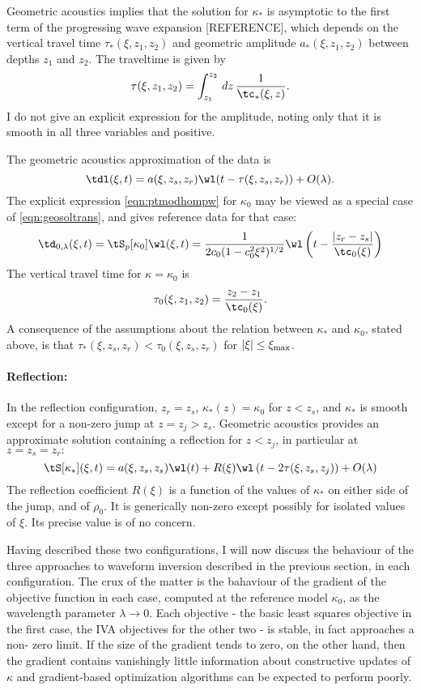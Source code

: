 Geometric acoustics implies that the solution for $\kappa_*$ is
asymptotic to the first term of the progressing wave expansion
[REFERENCE], which depends on the vertical
travel time $\tau_*(\xi,z_1,z_2)$ and geometric amplitude
$a_*(\xi,z_1,z_2)$ between depths $z_1$ and $z_2$. The traveltime is given by
\[
\tau(\xi,z_1,z_2) = \int_{z_1}^{z_2}\,dz\, \frac{1}{\tc_*(\xi,z)}.
\]
I do not give an explicit expression for the amplitude, noting only
that it is smooth in all three variables and positive.

The geometric
acoustics approximation of the data is
\begin{equation}
  \label{eqn:geosoltrans}
  \tdl(\xi,t) = a(\xi,z_s,z_r)\wl(t-\tau(\xi,z_s,z_r)) + O(\lambda). 
\end{equation}
The explicit expression \ref{eqn:ptmodhompw} for $\kappa_0$ may be 
viewed as a special case of \ref{eqn:geosoltrans}, and gives reference 
data for that case: 
\begin{equation}
  \label{eqn:analsoltrans}
  \td_{0,\lambda}(\xi,t) =  \tS_p[\kappa_0]\wl(\xi,t)  = \frac{1}{2c_0(1-c_0^2\xi^2)^{1/2}}\wl 
                                \left(t-\frac{|z_r-z_s|}{\tc_0(\xi)}\right) 
\end{equation}
The vertical travel time for $\kappa=\kappa_0$ is
\[
  \tau_0(\xi,z_1,z_2) = \frac{z_2-z_1}{\tc_0(\xi)}.
\]
A consequence of the assumptions about the relation between $\kappa_*$
and $\kappa_0$, stated above, is that $\tau_*(\xi,z_s,z_r) <
\tau_0(\xi,z_s,z_r)$ for $|\xi|\le \xi_{\rm max}$.

\paragraph{Reflection:}
In the reflection configuration, $z_r=z_s$, $\kappa_*(z)=\kappa_0$ for
$z<z_s$, and $\kappa_*$ is smooth except for a non-zero jump at $z=z_j
> z_s$. Geometric acoustics provides an approximate solution
containing a reflection for $z<z_j$, in particular at $z=z_s=z_r:$
\[
\tS[\kappa_*](\xi,t) = a(\xi,z_s,z_s)\wl(t) +
R(\xi)\wl\left(t-2\tau(\xi,z_s,z_j)\right) + O(\lambda)
\]
The reflection coefficient $R(\xi)$ is a function of the values of
$\kappa_*$ on either side of the jump, and of $\rho_0$. It is
generically non-zero except possibly for isolated values of $\xi$. Its precise
value is of no concern.

Having described these two configurations, I will now discuss the
behaviour of the three approaches to waveform inversion described in
the previous section, in each configuration. The crux of the matter is
the bahaviour of the gradient of the objective function in each case,
computed at the reference model $\kappa_0$,
as the wavelength parameter $\lambda \rightarrow 0$. Each objective -
the basic least squares objective in the first case, the IVA
objectives for the other two - is stable, in fact approaches a non-
zero limit. If the size of the gradient tends to zero, on the other
hand, then the gradient contains vanishingly little information about
constructive updates of $\kappa$ and gradient-based optimization
algorithms can be expected to perform poorly.

